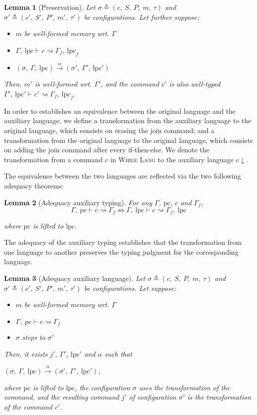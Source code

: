 \documentclass[10pt]{article}
\newcommand{\pc}{\mathrm{pc}}
\newcommand{\lpc}{\mathrm{lpc}}
\newcommand{\ctx}{\Gamma}
\newcommand{\conf}{\sigma}
\newcommand{\typing}[4]{ #1,~#2 \vdash #3 \rightsquigarrow #4}
\newcommand{\typingaux}[5]{ #1,~#2 \vdash #3 \rightsquigarrow #4,~#5}
\newcommand{\execaux}[7] { (#1,~#2,~#3) \xrightarrow{#4} (#5,~#6,~#7) }
\newcommand{\whilelang}{\textsc{While Lang} }
\newcommand{\compile}[1]{ #1 \downarrow }
\newtheorem{lemma}{Lemma}
\begin{document}
\begin{lemma}[Preservation]\label{thm:preservation}
  Let $\conf \triangleq (c,~S,~P,~m,~\tau)$ and
  $\conf' \triangleq (c',~S',~P',~m',~\tau')$ be configurations.
  Let further suppose:
  \begin{itemize}
    \item $m$ be well-formed memory wrt. $\ctx$
    \item $\typingaux{\ctx}{\lpc}{c}{\ctx_{f}}{\lpc_{f}}$
    \item \( \execaux{\conf}{\ctx}{\lpc}{\alpha}{\conf'}{\ctx'}{\lpc'} \)
  \end{itemize}

  Then, $m'$ is well-formed wrt. $\ctx'$, and the command $c'$ is also well-typed
  $\typingaux{\ctx'}{\lpc'}{c'}{\ctx_{f}}{\lpc_{f}}$.
\end{lemma}

In order to establishes an equivalence between the original language and the auxiliary language, we
define a transformation from the auxiliary language to the original language, which consists on
erasing the join command; and a transformation from the original language to the original language,
which consists on adding the join command after every if-then-else.
We denote the transformation from a command $c$ in \whilelang to the auxiliary language
$\compile{c}$.

The equivalence between the two languages are reflected via the two following adequacy theorems:

\begin{lemma}[Adequacy auxiliary typing]
  For any $\ctx$, $\pc$, $c$ and $\ctx_{f}$,
  \[
  \typing{\ctx}{\pc}{c}{\ctx_{f}}
  \Leftrightarrow
    \typingaux{\ctx}{\lpc}{c}{\ctx_{f}}{\lpc}
  \]

  where $\pc$ is lifted to $\lpc$.
\end{lemma}

The adequacy of the auxiliary typing establishes that the transformation from one language to
another preserves the typing judgment for the corresponding language.

\begin{lemma}[Adequacy auxiliary language]
  Let $\conf \triangleq (c,~S,~P,~m,~\tau)$ and
  $\conf' \triangleq (c',~S',~P',~m',~\tau')$ be configurations.
  Let suppose:
  \begin{itemize}
    \item $m$ be well-formed memory wrt. $\ctx$
    \item $\typing{\ctx}{\pc}{c}{\ctx_{f}}$
    \item $\conf$ steps to $\conf'$
  \end{itemize}

  Then, it exists $j'$, $\ctx'$, $\lpc'$ and $\alpha$ such that

  \( \execaux{\conf}{\ctx}{\lpc}{\alpha}{\conf'}{\ctx'}{\lpc'} \),

  where $\pc$ is lifted to $\lpc$, the configuration $\conf$ uses the transformation of the command,
  and the resulting command $j'$ of configuration $\conf'$ is the transformation of the command $c'$.
\end{lemma}
\end{document}
